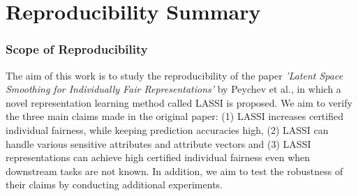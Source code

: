 \section*{\centering Reproducibility Summary}


\subsubsection*{Scope of Reproducibility}


The aim of this work is to study the reproducibility of the paper \textit{'Latent Space Smoothing for Individually Fair Representations'} by Peychev et al., in which a novel representation learning method called LASSI is proposed. We aim to verify the three main claims made in the original paper: (1) LASSI increases certified individual fairness, while keeping prediction accuracies high, (2) LASSI can handle various sensitive attributes and attribute vectors and (3) LASSI representations can achieve high certified individual fairness even when downstream tasks are not known. In addition, we aim to test the robustness of their claims by conducting additional experiments.





